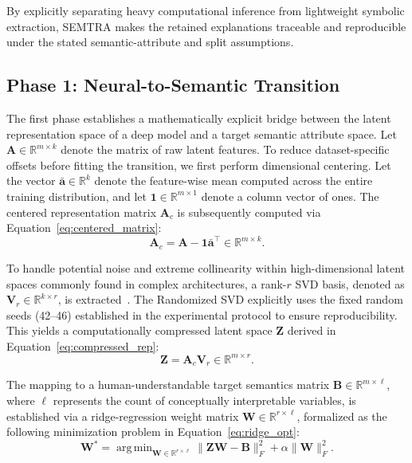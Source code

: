 \documentclass[make,article,submit,pdftex,moreauthors]{Definitions/mdpi}
\newcommand{\matA}{\mathbf{A}}
\newcommand{\matB}{\mathbf{B}}
\newcommand{\matW}{\mathbf{W}}
\newcommand{\matZ}{\mathbf{Z}}
\newcommand{\matV}{\mathbf{V}}
\newcommand{\R}{\mathbb{R}}
\DeclareMathOperator*{\argmin}{arg\,min}
\begin{document}
By explicitly separating heavy computational inference from lightweight symbolic extraction, SEMTRA makes the retained explanations traceable and reproducible under the stated semantic-attribute and split assumptions.

\subsection{Phase 1: Neural-to-Semantic Transition}
\label{subsec:transition_matrix}

The first phase establishes a mathematically explicit bridge between the latent representation space of a deep model and a target semantic attribute space. Let $\matA \in \R^{m \times k}$ denote the matrix of raw latent features. To reduce dataset-specific offsets before fitting the transition, we first perform dimensional centering. Let the vector $\bar{\mathbf{a}} \in \R^{k}$ denote the feature-wise mean computed across the entire training distribution, and let $\mathbf{1} \in \mathbb{R}^{m \times 1}$ denote a column vector of ones. The centered representation matrix $\matA_c$ is subsequently computed via Equation~\eqref{eq:centered_matrix}:
\begin{equation}
 \label{eq:centered_matrix}
 \matA_c = \matA - \mathbf{1}\bar{\mathbf{a}}^{\top} \in \R^{m \times k}.
\end{equation}

To handle potential noise and extreme collinearity within high-dimensional latent spaces commonly found in complex architectures, a rank-$r$ SVD basis, denoted as $\matV_r \in \R^{k \times r}$, is extracted~\cite{Halko2011RandomizedSVD}. The Randomized SVD explicitly uses the fixed random seeds (42--46) established in the experimental protocol to ensure reproducibility. This yields a computationally compressed latent space $\matZ$ derived in Equation~\eqref{eq:compressed_rep}:
\begin{equation}
 \label{eq:compressed_rep}
 \matZ = \matA_c\matV_r \in \R^{m \times r}.
\end{equation}

The mapping to a human-understandable target semantics matrix $\matB \in \R^{m \times \ell}$, where $\ell$ represents the count of conceptually interpretable variables, is established via a ridge-regression weight matrix $\matW \in \R^{r \times \ell}$, formalized as the following minimization problem in Equation~\eqref{eq:ridge_opt}:
\begin{equation}
 \label{eq:ridge_opt}
 \matW^{\ast} = \argmin_{\matW \in \R^{r \times \ell}} \|\matZ\matW - \matB\|_F^2 + \alpha\|\matW\|_F^2.
\end{equation}
\end{document}
